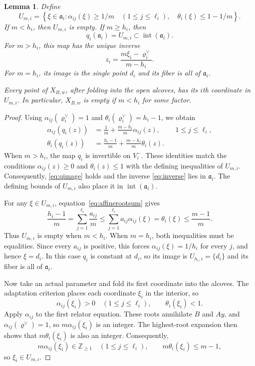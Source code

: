 \documentclass[11pt,a4paper,reqno]{amsart}
\theoremstyle{plain}
\newtheorem{lemma}[theorem]{Lemma}
\theoremstyle{definition}
\theoremstyle{remark}
\numberwithin{equation}{section}
\newcommand{\ZZ}{\mathbb Z}
\newcommand{\fa}{\mathfrak a}
\newcommand{\rh}{\varrho^\vee}
\begin{document}
\begin{lemma}\label{lem:alcoveimage} Define
\[
U_{m,i}=
\left\{\xi\in\fa_i:
\alpha_{ij}(\xi)\ge 1/m\quad(1\le j\le\ell_i),\quad
\theta_i(\xi)\le 1-1/m
\right\}.
\]
If $m<h_i$, then $U_{m,i}$ is empty. If $m\ge h_i$, then
\begin{equation}\label{eq:qimage}
q_i(\fa_i)=U_{m,i}\subset\operatorname{int}(\fa_i).
\end{equation}
For $m>h_i$, this map has the unique inverse
\begin{equation}\label{eq:inverse}
z_i=\frac{m\xi_i-\rh_i}{m-h_i}.
\end{equation}
For $m=h_i$, its image is the single point $d_i$ and its fiber is all of $\fa_i$.

Every point of $X_{B,w}$, after folding into the open alcoves, has its $i$th coordinate in $U_{m,i}$. In particular, $X_{B,w}$ is empty if $m<h_i$ for some factor.
\end{lemma}
\begin{proof}
Using $\alpha_{ij}(\rh_i)=1$ and $\theta_i(\rh_i)=h_i-1$, we obtain
\begin{equation}\label{eq:qcoordinates}
\begin{aligned}
\alpha_{ij}(q_i(z)) &=\frac1m+\frac{m-h_i}{m}\alpha_{ij}(z), &&1\le j\le\ell_i,\\
\theta_i(q_i(z)) &=\frac{h_i-1}{m}+\frac{m-h_i}{m}\theta_i(z).
\end{aligned}
\end{equation}
When $m>h_i$, the map $q_i$ is invertible on $V_i^-$. These identities match the conditions $\alpha_{ij}(z)\ge0$ and $\theta_i(z)\le1$ with the defining inequalities of $U_{m,i}$. Consequently, \eqref{eq:qimage} holds and the inverse \eqref{eq:inverse} lies in $\fa_i$. The defining bounds of $U_{m,i}$ also place it in $\operatorname{int}(\fa_i)$.

For any $\xi\in U_{m,i}$, equation~\eqref{eq:affinerootsum} gives
\[
\frac{h_i-1}{m} =\sum_{j=1}^{\ell_i}\frac{a_{ij}}m \le \sum_{j=1}^{\ell_i}a_{ij}\alpha_{ij}(\xi) =\theta_i(\xi) \le\frac{m-1}{m}.
\]
Thus $U_{m,i}$ is empty when $m<h_i$. When $m=h_i$, both inequalities must be equalities. Since every $a_{ij}$ is positive, this forces $\alpha_{ij}(\xi)=1/h_i$ for every $j$, and hence $\xi=d_i$. In this case $q_i$ is constant at $d_i$, so its image is $U_{h_i,i}=\{d_i\}$ and its fiber is all of $\fa_i$.

Now take an actual parameter and fold its first coordinate into the alcoves. The adaptation criterion places each coordinate $\xi_i$ in the interior, so
\[
\alpha_{ij}(\xi_i)>0\quad(1\le j\le\ell_i), \qquad \theta_i(\xi_i)<1.
\]
Apply $\alpha_{ij}$ to the first relator equation. These roots annihilate $B$ and $Ay$, and $\alpha_{ij}(\rh)=1$, so $m\alpha_{ij}(\xi_i)$ is an integer. The highest-root expansion then shows that $m\theta_i(\xi_i)$ is also an integer. Consequently,
\begin{equation}\label{eq:inequalities}
m\alpha_{ij}(\xi_i)\in\ZZ_{\ge1} \quad(1\le j\le\ell_i), \qquad m\theta_i(\xi_i)\le m-1,
\end{equation}
so $\xi_i\in U_{m,i}$.
\end{proof}
\end{document}
